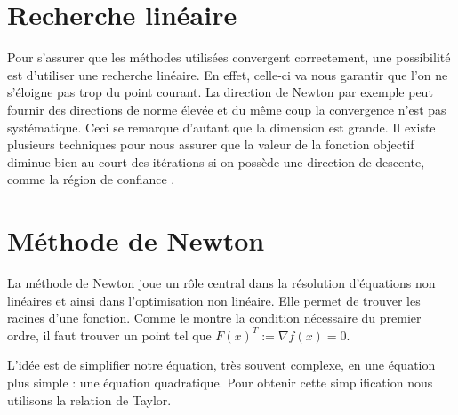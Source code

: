 \section{Recherche lin\'eaire}
Pour s'assurer que les m\'ethodes utilis\'ees convergent correctement, une possibilit\'e est d'utiliser une recherche lin\'eaire. En effet, celle-ci
va nous garantir que l'on ne s'\'eloigne pas trop du point courant. La direction de Newton par exemple peut fournir des directions 
de norme \'elev\'ee et du même coup la convergence n'est pas syst\'ematique. Ceci se remarque d'autant que la dimension est grande.
Il existe plusieurs techniques pour nous assurer que la valeur de la fonction objectif diminue bien au court des it\'erations
si on poss\`ede une direction de descente, comme la r\'egion de confiance \cite{nocedal99}.




\section{M\'ethode de Newton}


La m\'ethode de Newton joue un rôle central dans la r\'esolution d'\'equations non lin\'eaires et ainsi dans l'optimisation 
non lin\'eaire. Elle permet de trouver les racines d'une fonction. Comme le montre la condition n\'ecessaire du premier ordre,
il faut trouver un point tel que $F(x)^T:=\nabla f(x)=0$.

 L'id\'ee est de simplifier notre \'equation, tr\`es souvent complexe, en une \'equation plus simple : une \'equation 
quadratique. Pour obtenir cette simplification nous utilisons la relation de Taylor.


% 


